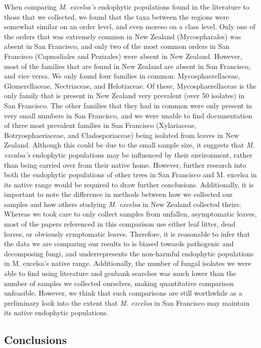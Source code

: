 \documentclass[fleqn,10pt,lineno]{wlpeerj} %
\begin{document}
When comparing \emph{M. excelsa's} endophytic populations found in the
literature to those that we collected, we found that the taxa between
the regions were somewhat similar on an order level, and even moreso on
a class level. Only one of the orders that was extremely common in New
Zealand (Mycospharales) was absent in San Francisco, and only two of the
most common orders in San Francisco (Capnodiales and Pezizales) were
absent in New Zealand. However, most of the families that are found in
New Zealand are absent in San Francisco, and vice versa. We only found
four families in common: Mycosphaerellaceae, Glomerellaceae,
Nectriaceae, and Helotiaceae. Of these, Mycosphaerellaceae is the only
family that is present in New Zealand very prevalent (over 50 isolates)
in San Francisco. The other families that they had in common were only
present in very small numbers in San Francisco, and we were unable to
find documentation of three most prevalent families in San Francisco
(Xylariaceae, Botryosphaeriaceae, and Cladosporiaceae) being isolated
from leaves in New Zealand. Although this could be due to the small
sample size, it suggests that \emph{M. excalsa's} endophytic populations
may be influenced by their environment, rather than being carried over
from their native home. However, further research into both the
endophytic populations of other trees in San Francisco and M. excelsa in
its native range would be required to draw further conclusions.
Additionally, it is important to note the difference in methods between
how we collected our samples and how others studying \emph{M. excelsa}
in New Zealand collected theirs. Whereas we took care to only collect
samples from unfallen, asymptomatic leaves, most of the papers
referenced in this comparison use either leaf litter, dead leaves, or
obviously symptomatic leaves. Therefore, it is reasonable to infer that
the data we are comparing our results to is biased towards pathogenic
and decomposing fungi, and underrepresents the non-harmful endophytic
populations in M. excelsa's native range. Additionally, the number of
fungal isolates we were able to find using literature and genbank
searches was much lower than the number of samples we collected
ourselves, making quantitative comparison unfeasible. However, we think
that such comparisons are still worthwhile as a preliminary look into
the extent that \emph{M. excelsa} in San Francisco may maintain its
native endophytic populations.

\hypertarget{conclusions}{%
\subsection{Conclusions}\label{conclusions}}
\end{document}
